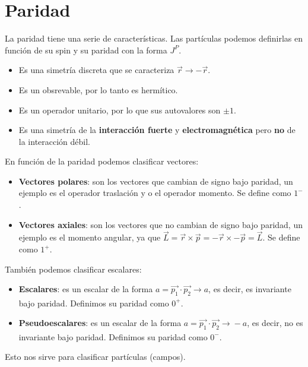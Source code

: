 \section{Paridad}
La paridad tiene una serie de características. Las partículas podemos definirlas en función de su spin y su paridad con la forma $J^P$.
\begin{itemize}
    \item Es una simetría discreta que se caracteriza $\vec{r} \longrightarrow -\vec{r}$. 
    \item Es un obsrevable, por lo tanto es hermítico.
    \item Es un operador unitario, por lo que sus autovalores son $\pm 1$.
    \item Es una simetría de la \textbf{interacción fuerte} y \textbf{electromagnética} pero \textbf{no} de la interacción débil.
\end{itemize}
En función de la paridad podemos clasificar vectores:
\begin{itemize}
    \item \textbf{Vectores polares}: son los vectores que cambian de signo bajo paridad, un ejemplo es el operador traslación y o el operador momento. Se define como $1^-$.
    \item \textbf{Vectores axiales}: son los vectores que no cambian de signo bajo paridad, un ejemplo es el momento angular, ya que $\vec{L}=\vec{r}\times \vec{p}=-\vec{r}\times -\vec{p}=\vec{L} $. Se define como $1^+$.
\end{itemize}
También podemos clasificar escalares:
\begin{itemize}
    \item \textbf{Escalares}: es un escalar de la forma $a=\vec{p_1}\cdot \vec{p_2}\xrightarrow[]{} a$, es decir, es invariante bajo paridad. Definimos su paridad como $0^+$.
     \item \textbf{Pseudoescalares}: es un escalar de la forma $a=\vec{p_1}\cdot \vec{p_2}\xrightarrow[]{} -a$, es decir, no es invariante bajo paridad. Definimos su paridad como $0^-$.
\end{itemize}
Esto nos sirve para clasificar partículas (campos).
